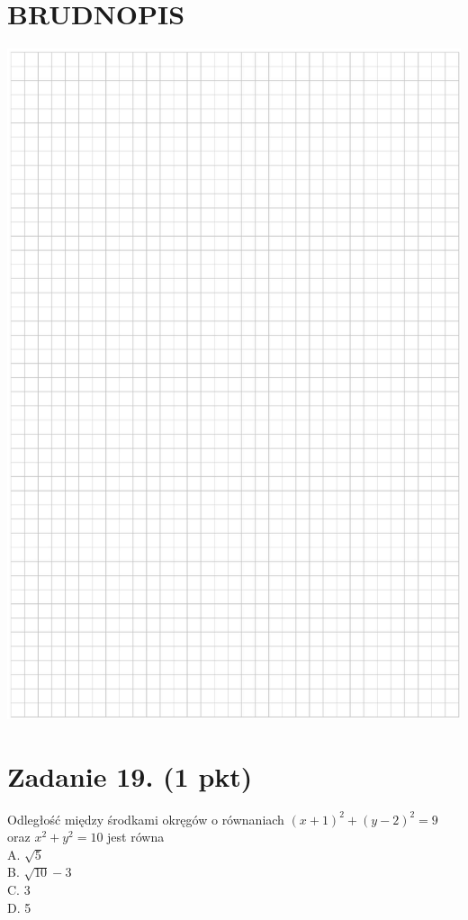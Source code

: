 \documentclass[10pt]{article}
\begin{document}
\section*{BRUDNOPIS}
\begin{center}
\includegraphics[max width=\textwidth]{2024_11_21_e0e8aab895018a50a9a7g-07}
\end{center}

\section*{Zadanie 19. (1 pkt)}
Odległość między środkami okręgów o równaniach \((x+1)^{2}+(y-2)^{2}=9\) oraz \(x^{2}+y^{2}=10\) jest równa\\
A. \(\sqrt{5}\)\\
B. \(\sqrt{10}-3\)\\
C. 3\\
D. 5
\end{document}
